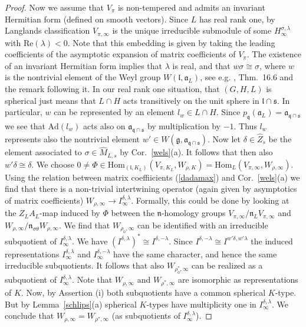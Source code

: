 \documentclass[10]{amsart}
\theoremstyle{remark}
\theoremstyle{definition}
\numberwithin{equation}{section}
\newcommand{\Hom}{\mathrm{Hom}}
\newcommand{\Ad}{\text{Ad}}
\newcommand{\fa}{{\mathfrak a}}             %
\newcommand{\fg}{{\mathfrak g}}
\newcommand{\fl}{{\mathfrak l}}
\newcommand{\fn}{{\mathfrak n}}
\newcommand{\fq}{{\mathfrak q}}
\newcommand{\fs}{{\mathfrak s}}
\begin{document}
{\begin{proof}
Now we assume that $V_\pi$ is non-tempered and admits an invariant Hermitian form (defined on smooth vectors). Since $L$ has real rank one, by Langlands
classification $V_{\pi,\infty}$ is the unique irreducible submodule of some $H^{\sigma,\lambda}_\infty$ with $\mathrm{Re}(\lambda)<0$. Note that this embedding is given by taking the leading coefficients of the asymptotic expansion of matrix coefficients of $V_\pi$. The existence of an invariant Hermitian form implies that
$\lambda$ is real, and that $w\sigma\cong\sigma$, where $w$ is the nontrivial element of the Weyl group $W(\fl,\fa_L)$, see e.g. \cite{Kn86}, Thm.~16.6 and the remark following it.
In our real rank one situation, that $(G,H,L)$ is spherical just means that $L\cap H$ acts transitively on the unit sphere in $\fl\cap\fs$. In particular, $w$ can be represented by an element 
$l_w\in L\cap H$. Since $p_\fq (\fa_L)=\fa_{\fq\cap\fs}$ we see that $\Ad(l_w)$ acts also on $\fa_{\fq\cap\fs}$ by multiplication by $-1$. Thus $l_w$ represents also
the nontrivial element $w'\in W(\fg,\fa_{\fq\cap\fs})$. Now let $\delta\in\widehat Z_s$ be the element associated to $\sigma\in\widehat M_{L,s}$ by Cor.~\ref{wels}(a).
It follows that then also $w'\delta\cong\delta$. We choose $0\ne\Phi \in  \Hom_{(\fl,K_L)}(V_{\pi,K_L},W_{\rho,K})=  \Hom_{L}(V_{\pi,\infty},W_{\rho,\infty})$.
Using the relation between matrix coeffiicients (\ref{dadamax}) and Cor.~\ref{wels}(a) we find that there is a non-trivial intertwining operator (again given by asymptotics of matrix coefficients) $W_{\rho,\infty}\rightarrow I^{\delta,\lambda}_\infty$. Formally, this could be done by looking at the $Z_LA_L$-map induced by $\Phi$ between the $\fn$-homology
groups $V_{\pi,\infty}/\fn_L V_{\pi,\infty}$ and $W_{\rho,\infty}/\fn_{\sigma\theta}W_{\rho,\infty}$. We find that $W_{\rho_0,\infty}$ can be identified with an irreducible subquotient
of $I^{\delta,\lambda}_\infty$. We have $(I^{\delta,\lambda})^*\cong I^{\delta,-\lambda}$. Since $I^{\delta,-\lambda}\cong I^{w'\delta,w'\lambda}$ the induced representations
$I^{\delta,\lambda}_\infty$ and $I^{\delta,-\lambda}_\infty$ have the same character, and hence the same irreducible subquotients. It follows that also $W_{\rho_0^*,\infty}$ can
be realized as a subquotient of $I^{\delta,\lambda}_\infty$. Note that $W_{\rho,\infty}$ and $W_{\rho^*,\infty}$ are isomorphic as representations of $K$. Now, by Assertion (i) both subquotients
have a common spherical $K$-type. But by Lemma~\ref{schlips}(a) spherical $K$-types have multiplicity one in $I^{\delta,\lambda}_\infty$. We conclude that $W_{\rho,\infty}=W_{\rho^*,\infty}$
(as subquotients of $I^{\delta,\lambda}_\infty$).
\end{proof}


}
\end{document}
